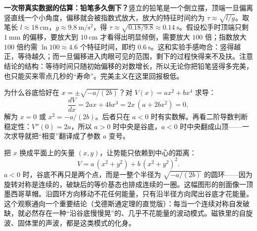 \begin{center}
\end{center}

\begin{mainline}
\textbf{一次带真实数据的估算：铅笔多久倒下？}竖立的铅笔是一个倒立摆，顶端一旦偏离竖直线一个小角度，偏移就会被指数式放大，放大的特征时间约为 \(\tau\approx\sqrt{l/g}\)。取笔长 \(l\approx 18\ \mathrm{cm}\)，\(g\approx 9.8\ \mathrm{m/s^{2}}\)，得 \(\tau\approx\sqrt{0.18/9.8}\approx 0.14\ \mathrm{s}\)。假设松手时顶端只剩 \(1\ \mathrm{mm}\) 的偏移，要放大到 \(10\ \mathrm{cm}\) 才看得出明显倾倒，需要放大 \(100\) 倍；指数放大 \(100\) 倍约需 \(\ln 100\approx 4.6\) 个特征时间，即约 \(0.6\ \mathrm{s}\)。这和实验手感吻合：竖得越正，等待越久；而一旦偏移进入肉眼可见的范围，剩下的过程快得来不及扶。注意结论的结构：等待时间只随初始偏移的对数增长，所以无论你把铅笔竖得多完美，也只能买来零点几秒的“寿命”。完美主义在这里回报极低。
\end{mainline}

\begin{mathbridge}
为什么谷底恰好在 \(x=\pm\sqrt{-a/(2b)}\)？对 \(V(x)=ax^{2}+bx^{4}\) 求导：
\[
\frac{dV}{dx}=2ax+4bx^{3}=2x\,(a+2bx^{2})=0,
\]
解为 \(x=0\) 或 \(x^{2}=-a/(2b)\)。后者只在 \(a<0\) 时有实数解。再看二阶导数判断稳定性：\(V''(0)=2a\)，所以 \(a>0\) 时中央是谷底，\(a<0\) 时中央翻成山顶——一次求导就把“相变”翻译成了参数 \(a\) 变号。

把 \(x\) 换成平面上的矢量 \((x,y)\)，让势能只依赖到中心的距离：
\[
V=a\,(x^{2}+y^{2})+b\,(x^{2}+y^{2})^{2}.
\]
\(a<0\) 时，谷底不再只是两个点，而是一整个半径为 \(\sqrt{-a/(2b)}\) 的圆环——因为旋转对称是连续的，破缺后的等价基态也排成连续的一圈。这幅图形的剖面像一顶墨西哥草帽。沿圆环方向移动不花任何能量，只有沿半径方向爬出谷底才花能量。这个观察通向一个重要结论（戈德斯通定理的直觉版）：每当一个连续对称自发破缺，就必然存在一种“沿谷底慢慢晃”的、几乎不花能量的波动模式。磁铁里的自旋波、固体里的声波，都是这类模式的化身。
\end{mathbridge}


